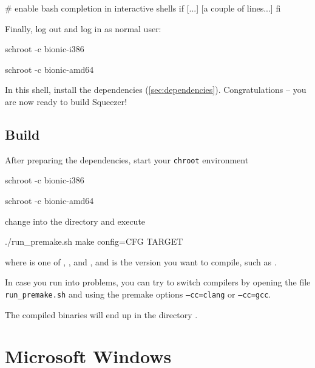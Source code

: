 \begin{VerbatimBoth}
  # enable bash completion in interactive shells
  if [...]
    [a couple of lines...]
  fi
\end{VerbatimBoth}

Finally, log out and log in as normal user:

\begin{Verbatim32}
  schroot -c bionic-i386
\end{Verbatim32}

\begin{Verbatim64}
  schroot -c bionic-amd64
\end{Verbatim64}

In this  shell, install the dependencies
(\ref{sec:dependencies}).  Congratulations -- you are now ready to
build Squeezer!

\subsection{Build}

After preparing the dependencies, start your \texttt{chroot}
environment

\begin{Verbatim32}
  schroot -c bionic-i386
\end{Verbatim32}

\begin{Verbatim64}
  schroot -c bionic-amd64
\end{Verbatim64}

change into the directory  and execute

\begin{VerbatimBoth}
  ./run_premake.sh
  make config=CFG TARGET
\end{VerbatimBoth}

where  is one of ,
,  and
, and  is the version
you want to compile, such as .

In case you run into problems, you can try to switch compilers by
opening the file \texttt{run\_premake.sh} and using the premake
options \texttt{--cc=clang} or \texttt{--cc=gcc}.

The compiled binaries will end up in the directory .

\section{Microsoft Windows}

